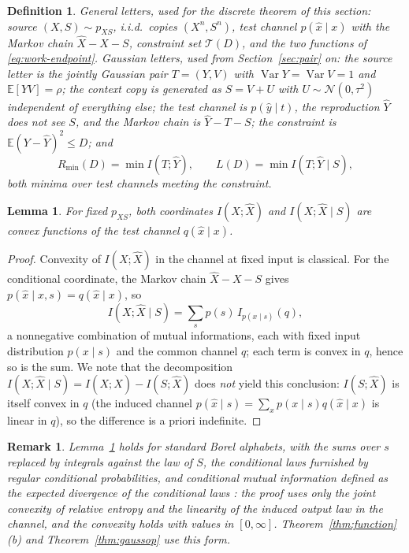 \documentclass[11pt,onecolumn]{IEEEtran}
\newtheorem{lemma}[theorem]{Lemma}
\newtheorem{remark}[theorem]{Remark}
\newtheorem{definition}[theorem]{Definition}
\newcommand{\E}{\mathbb{E}}
\newcommand{\hX}{\widehat{X}}
\newcommand{\hY}{\widehat{Y}}
\begin{document}
\begin{definition}\label{def:problem}
\emph{General letters}, used for the discrete theorem of this section:
source $(X,S)\sim p_{XS}$, i.i.d.\ copies $(X^n,S^n)$, test channel
$p(\hat x\mid x)$ with the Markov chain $\hX-X-S$, constraint set
$\mathcal T(D)$, and the two functions of \eqref{eq:work-endpoint}.
\emph{Gaussian letters}, used from Section~\ref{sec:pair} on: the source
letter is the jointly Gaussian pair $T=(Y,V)$ with
$\operatorname{Var}Y=\operatorname{Var}V=1$ and $\E[YV]=\rho$; the context
copy is generated as $S=V+U$ with $U\sim\mathcal N(0,\tau^2)$ independent
of everything else; the test channel is $p(\hat y\mid t)$, the reproduction
$\hY$ does not see $S$, and the Markov chain is $\hY-T-S$; the constraint
is $\E(Y-\hY)^2\le D$; and
\[
R_{\min}(D)=\min I(T;\hY),
\qquad
L(D)=\min I(T;\hY\mid S),
\]
both minima over test channels meeting the constraint.
\end{definition}

\begin{lemma}\label{lem:convexity}
For fixed $p_{XS}$, both coordinates $I(X;\hX)$ and $I(X;\hX\mid S)$ are
convex functions of the test channel $q(\hat x\mid x)$.
\end{lemma}

\begin{proof}
Convexity of $I(X;\hX)$ in the channel at fixed input is classical. For the
conditional coordinate, the Markov chain $\hX-X-S$ gives
$p(\hat x\mid x,s)=q(\hat x\mid x)$, so
\begin{equation}
 I(X;\hX\mid S)=\sum_s p(s)\,I_{p(x\mid s)}(q),
 \label{eq:per-s-decomposition}
\end{equation}
a nonnegative combination of mutual informations, each with fixed input
distribution $p(x\mid s)$ and the common channel $q$; each term is convex in
$q$, hence so is the sum. We note that the decomposition
$I(X;\hX\mid S)=I(X;\hX)-I(S;\hX)$ does \emph{not} yield this conclusion:
$I(S;\hX)$ is itself convex in $q$ (the induced channel
$p(\hat x\mid s)=\sum_x p(x\mid s)q(\hat x\mid x)$ is linear in $q$), so the
difference is a priori indefinite.
\end{proof}

\begin{remark}\label{rem:convgeneral}
Lemma~\ref{lem:convexity} holds for standard Borel alphabets, with the
sums over $s$ replaced by integrals against the law of $S$, the
conditional laws furnished by regular conditional probabilities, and
conditional mutual information defined as the expected divergence of the
conditional laws \cite{wyner1978}: the proof uses only the joint
convexity of relative entropy \cite{csiszar1967} and the linearity of
the induced output law in the channel, and the convexity holds with
values in $[0,\infty]$. Theorem~\ref{thm:function}(b) and Theorem~\ref{thm:gaussop}
use this form.
\end{remark}
\end{document}
